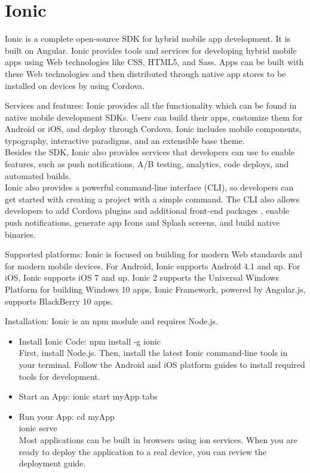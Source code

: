 \section{Ionic}
Ionic is a complete open-source SDK for hybrid mobile app development. It is built on Angular. Ionic provides tools and services for developing hybrid mobile apps using Web technologies like CSS, HTML5, and Sass. Apps can be built with these Web technologies and then distributed through native app stores to be installed on devices by using Cordova.
\item Services and features: Ionic provides all the functionality which can be found in native mobile development SDKs. Users can build their apps, customize them for Android or iOS, and deploy through Cordova. Ionic includes mobile components, typography, interactive paradigms, and an extensible base theme. \\ Besides the SDK, Ionic also provides services that developers can use to enable features, such as push notifications, A/B testing, analytics, code deploys, and automated builds. \\ Ionic also provides a powerful command-line interface (CLI), so developers can get started with creating a project with a simple command. The CLI also allows developers to add Cordova plugins and additional front-end packages \cite{7}, enable push notifications, generate app Icons and Splash screens, and build native binaries. \\
\item Supported platforms: Ionic is focused on building for modern Web standards and for modern mobile devices. For Android, Ionic supports Android 4.1 and up. For iOS, Ionic supports iOS 7 and up. Ionic 2 supports the Universal Windows Platform for building Windows 10 apps. Ionic Framework, powered by Angular.js, supports BlackBerry 10 apps.
\item Installation: Ionic is an npm module and requires Node.js.
\begin{itemize}
\\ \item Install Ionic Code: npm install -g ionic \\ First, install Node.js. Then, install the latest Ionic command-line tools in your terminal. Follow the Android and iOS platform guides to install required tools for development. \\ 
\item Start an App: ionic start myApp tabs
\item Run your App: cd myApp \\ ionic serve \\ Most applications can be built in browsers using ion services. When you are ready to deploy the application to a real device, you can review the deployment guide.
\end{itemize}




